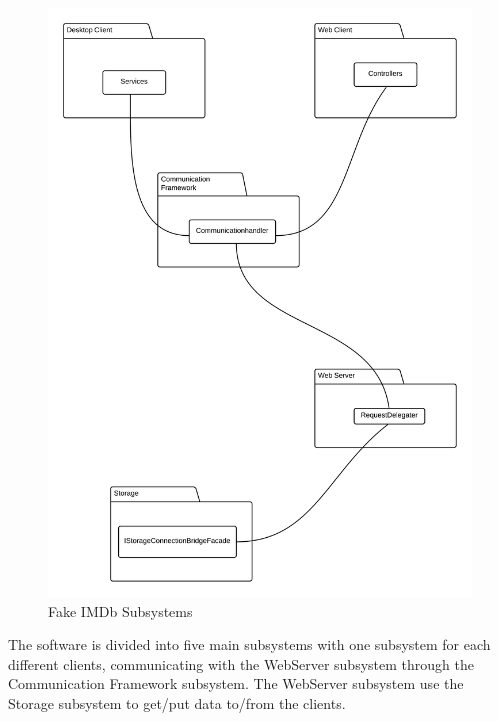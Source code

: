 \begin{figure}[H]
\includegraphics[scale=0.17]{img/SDD/FakeIMDbSubsytems.png}
\caption{Fake IMDb Subsystems}
\label{fig:FakeIMDBSubsystems}
\end{figure}

The software is divided into five main subsystems with one subsystem for each different clients, communicating with the WebServer subsystem through the Communication Framework subsystem. The WebServer subsystem use the Storage subsystem to get/put data to/from the clients.\\


